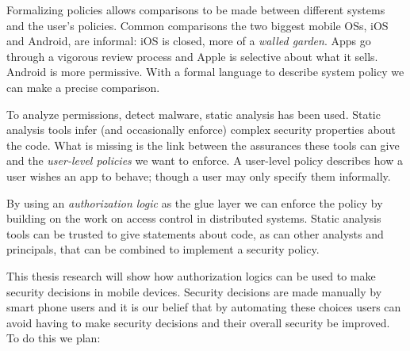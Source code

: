 \documentclass[a4paper]{article}
\begin{document}
Formalizing policies allows comparisons to be made between different systems and
the user's policies.  Common comparisons the two biggest mobile OSs, iOS and
Android, are informal: iOS is closed, more of a \emph{walled garden}. Apps go
through a vigorous review process and Apple is selective about what it sells.
Android is more permissive.  With a formal language to describe system policy we
can make a precise comparison. 

To analyze permissions, detect malware, static analysis has been used.
Static analysis tools infer (and occasionally enforce) complex security
properties about the code.  What is missing is the link between the assurances
these tools can give and the \emph{user-level policies} we want to enforce.  A
user-level policy describes how a user wishes an app to behave; though a user
may only specify them informally.

By using an \emph{authorization logic} as the glue layer we can enforce the
policy by building on the work on access control in distributed systems.  Static
analysis tools can be trusted to give statements about code, as can other
analysts and principals, that can be combined to implement a security policy.

This thesis research will show how authorization logics can be used to make
security decisions in mobile devices.  Security decisions are made manually by
smart phone users and it is our belief that by automating these choices users
can avoid having to make security decisions and their overall security be
improved.  To do this we plan: 
\end{document}
